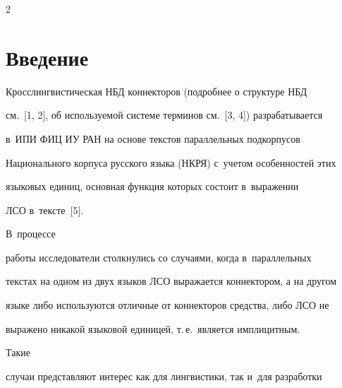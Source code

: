   


\vspace*{-2pt}













\thispagestyle{headings}





\begin{multicols}{2}





\label{st\stat}


   


\section{Введение}





   Кросслингвистическая НБД коннекторов (подробнее о структуре НБД 


см.~[1, 2], об использу\-емой системе терминов см.~[3, 4]) разрабатывается 


в~ИПИ ФИЦ ИУ РАН на основе текстов параллельных подкорпусов 


Национального корпуса русского языка (НКРЯ) с~учетом особенностей этих 


языковых единиц, основная функция которых состоит в~выражении  


ЛСО в~тексте~[5]. 





В~процессе 


работы исследователи столкнулись со случаями, когда в~параллельных 


текстах на одном из двух языков ЛСО выражается коннектором, а на другом 


языке либо используются отличные от коннекторов средства, либо ЛСО не 


выражено никакой языковой единицей, т.\,е.\ является имплицитным. 





Такие 


случаи представляют интерес как для лингвистики, так и~для разработки 



\end{multicols}
